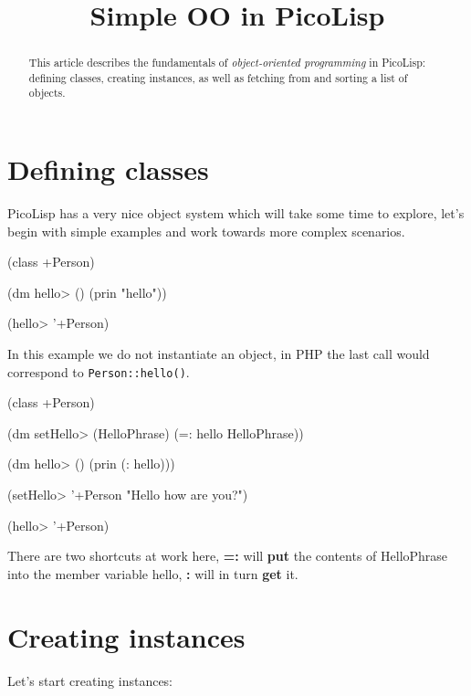 \title{Simple OO in PicoLisp}

\maketitle

\begin{abstract}
  This article describes the fundamentals of \emph{object-oriented
  programming} in PicoLisp: defining classes, creating instances, as
  well as fetching from and sorting a list of objects. 
\end{abstract}

\section{Defining classes}
\label{sec:simple-oo-defining-classes}

PicoLisp has a very nice object system which will take some time to
explore, let's begin with simple examples and work towards more complex
scenarios.


\begin{wideverbatim}
(class +Person)

(dm hello> ()
    (prin "hello"))
 
(hello> '+Person)
\end{wideverbatim}

In this example we do not instantiate an object, in PHP the last call
would correspond to \texttt{Person::hello()}.


\begin{wideverbatim}
(class +Person)

(dm setHello> (HelloPhrase)
    (=: hello HelloPhrase))

(dm hello> ()
    (prin (: hello)))
    
(setHello> '+Person "Hello how are you?")

(hello> '+Person)
\end{wideverbatim}

There are two shortcuts at work here, \textbf{=:} will \textbf{put} the contents of
HelloPhrase into the member variable hello, \textbf{:} will in turn \textbf{get} it.


\section{Creating instances}
\label{sec:simple-oo-creating-instances}

Let's start creating instances:

